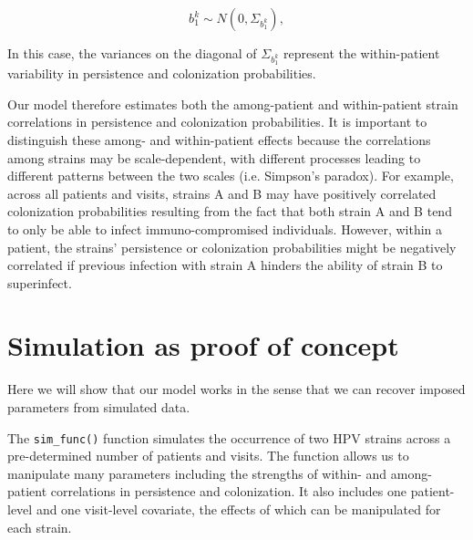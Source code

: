 \documentclass{article}
\begin{document}
$$ b^k_1 \sim N(0, \Sigma_{b^k_{1}}), $$

In this case, the variances on the diagonal of $\Sigma_{b^k_{1}}$ represent the within-patient variability in persistence and colonization probabilities.

Our model therefore estimates both the among-patient and within-patient strain correlations in persistence and colonization probabilities. It is important to distinguish these among- and within-patient effects because the correlations among strains may be scale-dependent, with different processes leading to different patterns between the two scales (i.e. Simpson's paradox). For example, across all patients and visits, strains A and B may have positively correlated colonization probabilities resulting from the fact that both strain A and B tend to only be able to infect immuno-compromised individuals. However, within a patient, the strains' persistence or colonization probabilities might be negatively correlated if previous infection with strain A hinders the ability of strain B to superinfect. 

\section*{Simulation as proof of concept}

Here we will show that our model works in the sense that we can recover imposed parameters from simulated data. 

The \texttt{sim\_func()} function simulates the occurrence of two HPV strains across a pre-determined number of patients and visits. The function allows us to manipulate many parameters including the strengths of within- and among-patient correlations in persistence and colonization. It also includes one patient-level and one visit-level covariate, the effects of which can be manipulated for each strain.
\end{document}
